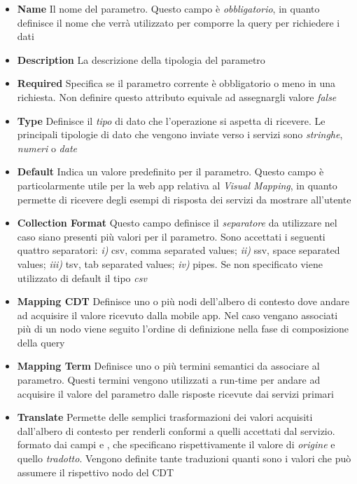 \begin{itemize}
	\item \textbf{Name}
	Il nome del parametro. Questo campo è \emph{obbligatorio}, in quanto definisce il nome che verrà utilizzato per comporre la query per richiedere i dati
	\item \textbf{Description}
	La descrizione della tipologia del parametro
	\item \textbf{Required}
	Specifica se il parametro corrente è obbligatorio o meno in una richiesta. Non definire questo attributo equivale ad assegnargli valore \emph{false}
	\item \textbf{Type}
	Definisce il \emph{tipo} di dato che l'operazione si aspetta di ricevere. Le principali tipologie di dato che vengono inviate verso i servizi sono \emph{stringhe}, \emph{numeri} o \emph{date}
	\item \textbf{Default}
	Indica un valore predefinito per il parametro. Questo campo è particolarmente utile per la web app relativa al \emph{Visual Mapping}, in quanto permette di ricevere degli esempi di risposta dei servizi da mostrare all'utente
	\item \textbf{Collection Format}
	Questo campo definisce il \emph{separatore} da utilizzare nel caso siano presenti più valori per il parametro. Sono accettati i seguenti quattro separatori: \emph{i)} csv, comma separated values; \emph{ii)} ssv, space separated values; \emph{iii)} tsv, tab separated values; \emph{iv)} pipes. Se non specificato viene utilizzato di default il tipo \emph{csv}
	\item \textbf{Mapping CDT}
	Definisce uno o più nodi dell'albero di contesto dove andare ad acquisire il valore ricevuto dalla mobile app. Nel caso vengano associati più di un nodo viene seguito l'ordine di definizione nella fase di composizione della query
	\item \textbf{Mapping Term}
	Definisce uno o più termini semantici da associare al parametro. Questi termini vengono utilizzati a run-time per andare ad acquisire il valore del parametro dalle risposte ricevute dai servizi primari
	\item \textbf{Translate}
	Permette delle semplici trasformazioni dei valori acquisiti dall'albero di contesto per renderli conformi a quelli accettati dal servizio. \upe formato dai campi  e , che specificano rispettivamente il valore di \emph{origine} e quello \emph{tradotto}. Vengono definite tante traduzioni quanti sono i valori che può assumere il rispettivo nodo del CDT
\end{itemize}

